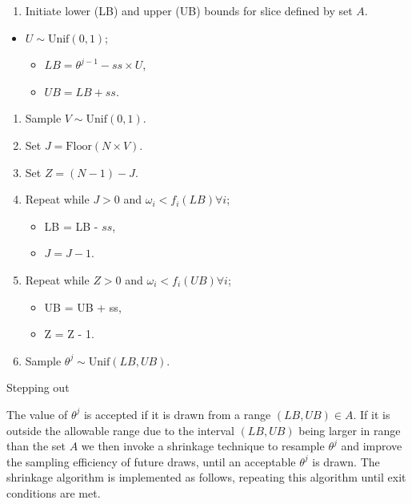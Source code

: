 \documentclass[article]{jss}
\begin{document}
%
\begin{algorithm}[H]
\begin{enumerate}
\item Initiate lower (LB) and upper (UB) bounds for slice defined by set
$A$.\end{enumerate}
\begin{itemize}
\item $U\sim\mbox{Unif}(0,1)$; 

\begin{itemize}
\item $LB=\theta^{j-1}-ss{\times}U$, 
\item $UB=LB+ss$. 
\end{itemize}
\end{itemize}
\begin{enumerate}
\item Sample $V\sim\mbox{Unif}(0,1)$. 
\item Set $J=\mbox{Floor}(N{\times}V)$. 
\item Set $Z=(N-1)-J$. 
\item Repeat while $J>0$ and $\omega_{i}<f_{i}(LB)\forall i$;

\begin{itemize}
\item LB = LB - $ss$, 
\item $J=J-1$. 
\end{itemize}
\item Repeat while $Z>0$ and $\omega_{i}<f_{i}(UB)\forall i$;

\begin{itemize}
\item UB = UB + ss, 
\item Z = Z - 1. 
\end{itemize}
\item Sample $\theta^{j}\sim\mbox{Unif}(LB,UB)$. 
\end{enumerate}
\caption{Stepping out}
\label{alg:steppingout}
\end{algorithm}


The value of $\theta^{j}$ is accepted if it is drawn from a range
$(LB,UB)\in A$. If it is outside the allowable range due to the
interval $(LB,UB)$ being larger in range than the set $A$ we then
invoke a shrinkage technique to resample $\theta^{j}$ and improve the
sampling efficiency of future draws, until an acceptable $\theta^{j}$
is drawn.  The shrinkage algorithm is implemented as follows,
repeating this algorithm until exit conditions are met.
\end{document}
